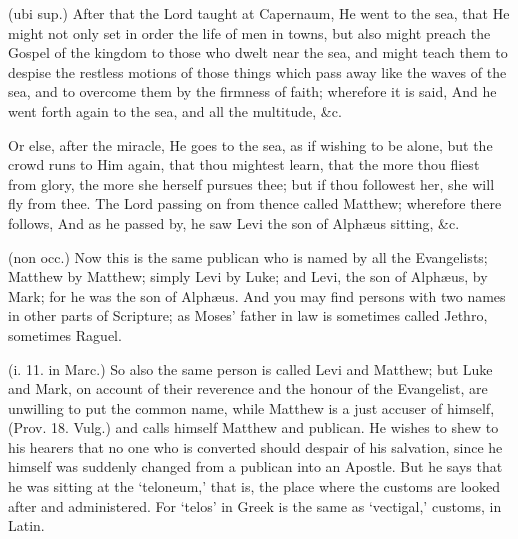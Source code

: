  

 (ubi sup.) After that the Lord taught at Capernaum, He went to the sea, that He might not only set in order the life of men in towns, but also might preach the Gospel of the kingdom to those who dwelt near the sea, and might teach them to despise the restless motions of those things which pass away like the waves of the sea, and to overcome them by the firmness of faith; wherefore it is said, And he went forth again to the sea, and all the multitude, \&c.

 Or else, after the miracle, He goes to the sea, as if wishing to be alone, but the crowd runs to Him again, that thou mightest learn, that the more thou fliest from glory, the more she herself pursues thee; but if thou followest her, she will fly from thee. The Lord passing on from thence called Matthew; wherefore there follows, And as he passed by, he saw Levi the son of Alphæus sitting, \&c.

 (non occ.) Now this is the same publican who is named by all the Evangelists; Matthew by Matthew; simply Levi by Luke; and Levi, the son of Alphæus, by Mark; for he was the son of Alphæus. And you may find persons with two names in other parts of Scripture; as Moses’ father in law is sometimes called Jethro, sometimes Raguel.

 (i. 11. in Marc.) So also the same person is called Levi and Matthew; but Luke and Mark, on account of their reverence and the honour of the Evangelist, are unwilling to put the common name, while Matthew is a just accuser of himself, (Prov. 18. Vulg.) and calls himself Matthew and publican. He wishes to shew to his hearers that no one who is converted should despair of his salvation, since he himself was suddenly changed from a publican into an Apostle. But he says that he was sitting at the ‘teloneum,’ that is, the place where the customs are looked after and administered. For ‘telos’ in Greek is the same as ‘vectigal,’ customs, in Latin.

